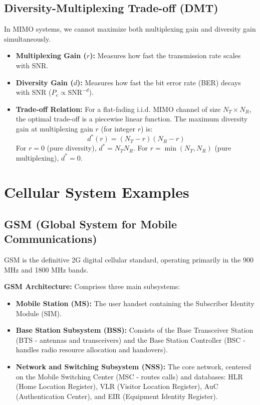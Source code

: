 \documentclass[12pt,a4paper]{article}
\begin{document}
\subsection{Diversity-Multiplexing Trade-off (DMT)}
In MIMO systems, we cannot maximize both multiplexing gain and diversity gain simultaneously.
\begin{itemize}[leftmargin=*, itemsep=3pt]
  \item \textbf{Multiplexing Gain ($r$):} Measures how fast the transmission rate scales with SNR.
  \item \textbf{Diversity Gain ($d$):} Measures how fast the bit error rate (BER) decays with SNR ($P_e \propto \text{SNR}^{-d}$).
  \item \textbf{Trade-off Relation:} For a flat-fading i.i.d. MIMO channel of size $N_T \times N_R$, the optimal trade-off is a piecewise linear function. The maximum diversity gain at multiplexing gain $r$ (for integer $r$) is:
    \begin{equation}
      d^*(r) = (N_T - r)(N_R - r)
    \end{equation}
    For $r=0$ (pure diversity), $d^* = N_T N_R$. For $r=\min(N_T, N_R)$ (pure multiplexing), $d^* = 0$.
\end{itemize}

\section{Cellular System Examples}

\subsection{GSM (Global System for Mobile Communications)}
GSM is the definitive 2G digital cellular standard, operating primarily in the 900 MHz and 1800 MHz bands.

\begin{tcolorbox}[defbox]
\textbf{GSM Architecture:} Comprises three main subsystems:
\begin{itemize}[leftmargin=*, itemsep=2.5pt, topsep=2pt]
  \item \textbf{Mobile Station (MS):} The user handset containing the Subscriber Identity Module (SIM).
  \item \textbf{Base Station Subsystem (BSS):} Consists of the Base Transceiver Station (BTS - antennas and transceivers) and the Base Station Controller (BSC - handles radio resource allocation and handovers).
  \item \textbf{Network and Switching Subsystem (NSS):} The core network, centered on the Mobile Switching Center (MSC - routes calls) and databases: HLR (Home Location Register), VLR (Visitor Location Register), AuC (Authentication Center), and EIR (Equipment Identity Register).
\end{itemize}
\end{tcolorbox}
\end{document}
